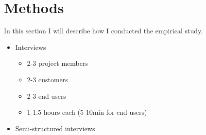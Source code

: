
\chapter{Methods}
\label{chapter:mehods}

In this section I will describe how I conducted the empirical study.

\begin{itemize}
  \item{Interviews}
  \begin{itemize}
    \item{2-3 project members}
    \item{2-3 customers}
    \item{2-3 end-users}
    \item{1-1.5 hours each (5-10min for end-users)}
  \end{itemize}
  \item{Semi-structured interviews}
\end{itemize}

